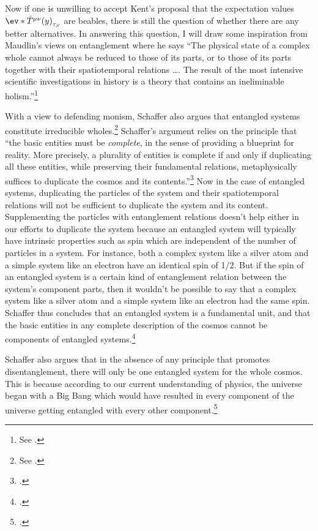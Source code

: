 \documentclass[12pt]{report}
\begin{document}
Now if one is unwilling to accept Kent's proposal that the expectation values $\ev*{\hat{T}^{\mu\nu}(y)}_{\tau_S}$ are beables, there is still the question of whether there are any better alternatives. In answering this question, I will  draw some inspiration from Maudlin's views on entanglement where he says ``The physical state of a complex whole cannot always be reduced to those of its parts, or to those of its parts together with their spatiotemporal relations \ldots. The result of the most intensive scientific investigations in history is a theory that contains an ineliminable holism.''\footnote{See \cite[56]{Maudlin2}.}  

With a view to defending monism, Schaffer also argues that entangled systems constitute irreducible wholes.\footnote{See \cite{SchafferJonathan2010MTPo}.} Schaffer's argument relies on the principle that ``the basic entities must be \emph{complete}, in the sense of providing a blueprint for reality. More precisely, a plurality of entities is complete if and only if duplicating all these entities, while preserving their fundamental relations, metaphysically suffices to duplicate the cosmos and its contents.''\footnote{\cite[39]{SchafferJonathan2010MTPo}.} Now in the case of entangled systems, duplicating the particles of the system and their spatiotemporal relations will not be sufficient to duplicate the system and its content. Supplementing the particles with entanglement relations doesn't help either in our efforts to duplicate the system because an entangled system will typically have intrinsic properties such as spin which are independent of the number of particles in a system. For instance, both a complex system like a silver atom and a simple system like an electron have an identical spin of 1/2. But if the spin of an entangled system is a certain kind of entanglement relation between the system's component parts, then it wouldn't be possible to say that a complex system like a silver atom and a simple system like an electron had the same spin. Schaffer thus concludes that an entangled system is a fundamental unit, and that the basic entities in any complete description of the cosmos cannot be components of entangled systems.\footnote{\cite[54]{SchafferJonathan2010MTPo}.}  

Schaffer also argues that in the absence of any principle that promotes disentanglement, there will only be one entangled system for the whole cosmos. This is because according to our current understanding of physics, the universe began with a Big Bang which would have resulted in every component of the universe getting entangled with every other component.\footnote{\cite[52]{SchafferJonathan2010MTPo}.}  
\end{document}
